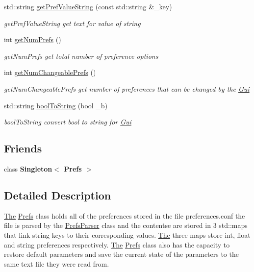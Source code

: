 \begin{DoxyCompactItemize}
\item 
std\+::string \hyperlink{class_prefs_a02c61a39dead1ac6f590df97a5eec9a3}{get\+Pref\+Value\+String} (const std\+::string \&\+\_\+key)
\begin{DoxyCompactList}\small\item\em get\+Pref\+Value\+String get text for value of string \end{DoxyCompactList}\item 
int \hyperlink{class_prefs_a6fa32524ac3fccc26fda2d0a26f4cb29}{get\+Num\+Prefs} ()
\begin{DoxyCompactList}\small\item\em get\+Num\+Prefs get total number of preference options \end{DoxyCompactList}\item 
int \hyperlink{class_prefs_a6279df26b85ead4284eb8dadabad37bf}{get\+Num\+Changeable\+Prefs} ()
\begin{DoxyCompactList}\small\item\em get\+Num\+Changeable\+Prefs get number of preferences that can be changed by the \hyperlink{class_gui}{Gui} \end{DoxyCompactList}\item 
std\+::string \hyperlink{class_prefs_a6ae72a257da7d2e72d63a47e5782ea65}{bool\+To\+String} (bool \+\_\+b)
\begin{DoxyCompactList}\small\item\em bool\+To\+String convert bool to string for \hyperlink{class_gui}{Gui} \end{DoxyCompactList}\end{DoxyCompactItemize}
\subsection*{Friends}
\begin{DoxyCompactItemize}
\item 
\hypertarget{class_prefs_a76acd714d838296134fb22641ac427a8}{}class {\bfseries Singleton$<$ Prefs $>$}\label{class_prefs_a76acd714d838296134fb22641ac427a8}

\end{DoxyCompactItemize}


\subsection{Detailed Description}
\hyperlink{namespace_the}{The} \hyperlink{class_prefs}{Prefs} class holds all of the preferences stored in the file preferences.\+conf the file is parsed by the \hyperlink{class_prefs_parser}{Prefs\+Parser} class and the contentse are stored in 3 std\+::maps that link string keys to their corresponding values. \hyperlink{namespace_the}{The} three maps store int, float and string preferences respectively. \hyperlink{namespace_the}{The} \hyperlink{class_prefs}{Prefs} class also has the capacity to restore default parameters and save the current state of the parameters to the same text file they were read from. 

